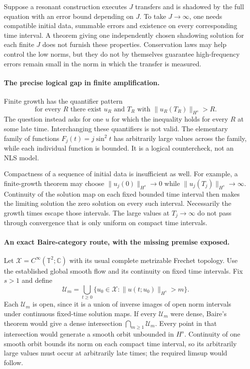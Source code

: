 \documentclass[11pt]{article}
\begin{document}
Suppose a resonant construction executes $J$ transfers and is
shadowed by the full equation with an error bound depending on $J$.
To take $J\to\infty$, one needs compatible initial data, summable
errors and existence on every corresponding time interval. A theorem
giving one independently chosen shadowing solution for each finite
$J$ does not furnish these properties. Conservation laws may help
control the low norms, but they do not by themselves guarantee
high-frequency errors remain small in the norm in which the transfer
is measured.

\paragraph{The precise logical gap in finite amplification.}
Finite growth has the quantifier pattern
\[
 \text{for every }R\text{ there exist }u_R\text{ and }T_R
       \text{ with }\|u_R(T_R)\|_{H^s}>R.
\]
The question instead asks for one $u$ for which the inequality holds
for every $R$ at some late time. Interchanging these quantifiers is
not valid. The elementary family of functions
$F_j(t)=j\sin^2t$ has arbitrarily large values across the family,
while each individual function is bounded. It is a logical
countercheck, not an NLS model.

Compactness of a sequence of initial data is insufficient as well.
For example, a finite-growth theorem may choose
$\|u_j(0)\|_{H^s}\to0$ while $\|u_j(T_j)\|_{H^s}\to\infty$.
Continuity of the solution map on each fixed bounded time interval
then makes the limiting solution the zero solution on every such
interval. Necessarily the growth times escape those intervals.
The large values at $T_j\to\infty$ do not pass through convergence
that is only uniform on compact time intervals.

\paragraph{An exact Baire-category route, with the missing premise exposed.}
Let $\mathcal X=C^\infty(\mathbb T^2;\mathbb C)$ with its usual
complete metrizable Frechet topology. Use the established global
smooth flow and its continuity on fixed time intervals. Fix $s>1$
and define
\[
 \mathcal U_m=\bigcup_{t\geq0}
      \{u_0\in\mathcal X:\|u(t;u_0)\|_{H^s}>m\}.
 \tag{387.11}
\]
Each $\mathcal U_m$ is open, since it is a union of inverse images
of open norm intervals under continuous fixed-time solution maps.
If every $\mathcal U_m$ were dense, Baire's theorem would give a
dense intersection $\bigcap_{m\geq1}\mathcal U_m$. Every point in
that intersection would generate a smooth orbit unbounded in $H^s$.
Continuity of one smooth orbit bounds its norm on each compact time
interval, so its arbitrarily large values must occur at arbitrarily
late times; the required limsup would follow.
\end{document}
